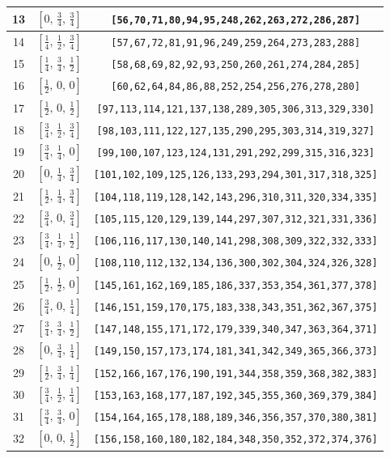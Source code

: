 \documentclass[fleqn,8pt]{jsarticle}
\begin{document}
\begin{longtable}{ccc}
13 & $\left[ 0,\, \frac{3}{4},\, \frac{3}{4} \right]$ & {\tt [56,70,71,80,94,95,248,262,263,272,286,287]} \\ \hline
14 & $\left[ \frac{1}{4},\, \frac{1}{2},\, \frac{3}{4} \right]$ & {\tt [57,67,72,81,91,96,249,259,264,273,283,288]} \\ \hline
15 & $\left[ \frac{1}{4},\, \frac{3}{4},\, \frac{1}{2} \right]$ & {\tt [58,68,69,82,92,93,250,260,261,274,284,285]} \\ \hline
16 & $\left[ \frac{1}{2},\, 0,\, 0 \right]$ & {\tt [60,62,64,84,86,88,252,254,256,276,278,280]} \\ \hline
17 & $\left[ \frac{1}{2},\, 0,\, \frac{1}{2} \right]$ & {\tt [97,113,114,121,137,138,289,305,306,313,329,330]} \\ \hline
18 & $\left[ \frac{3}{4},\, \frac{1}{2},\, \frac{3}{4} \right]$ & {\tt [98,103,111,122,127,135,290,295,303,314,319,327]} \\ \hline
19 & $\left[ \frac{3}{4},\, \frac{1}{4},\, 0 \right]$ & {\tt [99,100,107,123,124,131,291,292,299,315,316,323]} \\ \hline
20 & $\left[ 0,\, \frac{1}{4},\, \frac{3}{4} \right]$ & {\tt [101,102,109,125,126,133,293,294,301,317,318,325]} \\ \hline
21 & $\left[ \frac{1}{2},\, \frac{1}{4},\, \frac{3}{4} \right]$ & {\tt [104,118,119,128,142,143,296,310,311,320,334,335]} \\ \hline
22 & $\left[ \frac{3}{4},\, 0,\, \frac{3}{4} \right]$ & {\tt [105,115,120,129,139,144,297,307,312,321,331,336]} \\ \hline
23 & $\left[ \frac{3}{4},\, \frac{1}{4},\, \frac{1}{2} \right]$ & {\tt [106,116,117,130,140,141,298,308,309,322,332,333]} \\ \hline
24 & $\left[ 0,\, \frac{1}{2},\, 0 \right]$ & {\tt [108,110,112,132,134,136,300,302,304,324,326,328]} \\ \hline
25 & $\left[ \frac{1}{2},\, \frac{1}{2},\, 0 \right]$ & {\tt [145,161,162,169,185,186,337,353,354,361,377,378]} \\ \hline
26 & $\left[ \frac{3}{4},\, 0,\, \frac{1}{4} \right]$ & {\tt [146,151,159,170,175,183,338,343,351,362,367,375]} \\ \hline
27 & $\left[ \frac{3}{4},\, \frac{3}{4},\, \frac{1}{2} \right]$ & {\tt [147,148,155,171,172,179,339,340,347,363,364,371]} \\ \hline
28 & $\left[ 0,\, \frac{3}{4},\, \frac{1}{4} \right]$ & {\tt [149,150,157,173,174,181,341,342,349,365,366,373]} \\ \hline
29 & $\left[ \frac{1}{2},\, \frac{3}{4},\, \frac{1}{4} \right]$ & {\tt [152,166,167,176,190,191,344,358,359,368,382,383]} \\ \hline
30 & $\left[ \frac{3}{4},\, \frac{1}{2},\, \frac{1}{4} \right]$ & {\tt [153,163,168,177,187,192,345,355,360,369,379,384]} \\ \hline
31 & $\left[ \frac{3}{4},\, \frac{3}{4},\, 0 \right]$ & {\tt [154,164,165,178,188,189,346,356,357,370,380,381]} \\ \hline
32 & $\left[ 0,\, 0,\, \frac{1}{2} \right]$ & {\tt [156,158,160,180,182,184,348,350,352,372,374,376]} \\
\end{longtable}
\end{document}

